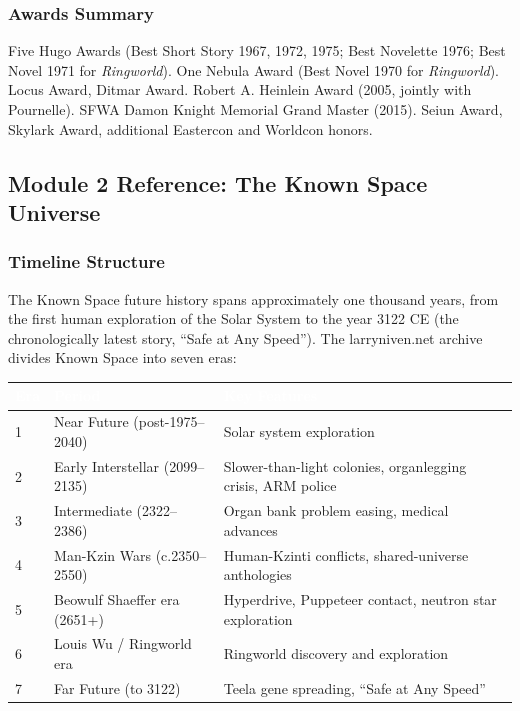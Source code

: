 \documentclass[11pt,letterpaper]{article}
\newcommand{\tableheader}[1]{\textbf{\sffamily\textcolor{white}{#1}}}
\begin{document}
\subsubsection{Awards Summary}

Five Hugo Awards (Best Short Story 1967, 1972, 1975; Best Novelette 1976; Best Novel 1971 for \textit{Ringworld}). One Nebula Award (Best Novel 1970 for \textit{Ringworld}). Locus Award, Ditmar Award. Robert A. Heinlein Award (2005, jointly with Pournelle). SFWA Damon Knight Memorial Grand Master (2015). Seiun Award, Skylark Award, additional Eastercon and Worldcon honors.

\subsection{Module 2 Reference: The Known Space Universe}

\subsubsection{Timeline Structure}

The Known Space future history spans approximately one thousand years, from the first human exploration of the Solar System to the year 3122 CE (the chronologically latest story, ``Safe at Any Speed''). The larryniven.net archive divides Known Space into seven eras:

\begin{center}
\begin{tabularx}{\textwidth}{C{1.5cm}L{3.5cm}X}
\toprule
{}
\tableheader{Era} & \tableheader{Period} & \tableheader{Key Features} \\
 & Near Future (post-1975--2040) & Solar system exploration \\
2 & Early Interstellar (2099--2135) & Slower-than-light colonies, organlegging crisis, ARM police \\
3 & Intermediate (2322--2386) & Organ bank problem easing, medical advances \\
4 & Man-Kzin Wars (c.2350--2550) & Human-Kzinti conflicts, shared-universe anthologies \\
5 & Beowulf Shaeffer era (2651+) & Hyperdrive, Puppeteer contact, neutron star exploration \\
6 & Louis Wu / Ringworld era & Ringworld discovery and exploration \\
7 & Far Future (to 3122) & Teela gene spreading, ``Safe at Any Speed'' \\
\bottomrule
\end{tabularx}
\end{center}
\end{document}
